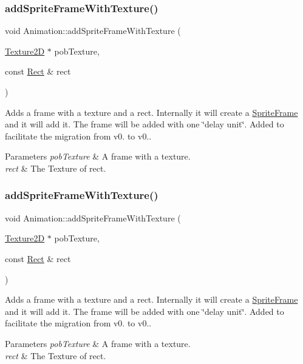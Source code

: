 \subsubsection{\texorpdfstring{add\+Sprite\+Frame\+With\+Texture()}{addSpriteFrameWithTexture()}\hspace{0.1cm}{\footnotesize\ttfamily [1/2]}}
{\footnotesize\ttfamily void Animation\+::add\+Sprite\+Frame\+With\+Texture (\begin{DoxyParamCaption}\item[{\hyperlink{classTexture2D}{Texture2D} $\ast$}]{pob\+Texture,  }\item[{const \hyperlink{classRect}{Rect} \&}]{rect }\end{DoxyParamCaption})}

Adds a frame with a texture and a rect. Internally it will create a \hyperlink{classSpriteFrame}{Sprite\+Frame} and it will add it. The frame will be added with one \char`\"{}delay unit\char`\"{}. Added to facilitate the migration from v0. to v0.. 
\begin{DoxyParams}{Parameters}
{\em pob\+Texture} & A frame with a texture. \\
\hline
{\em rect} & The Texture of rect. \\
\hline
\end{DoxyParams}
\mbox{\label{classAnimation_aae5886a21a9c86e88269e35aa58a7ab1}} 
\subsubsection{\texorpdfstring{add\+Sprite\+Frame\+With\+Texture()}{addSpriteFrameWithTexture()}\hspace{0.1cm}{\footnotesize\ttfamily [2/2]}}
{\footnotesize\ttfamily void Animation\+::add\+Sprite\+Frame\+With\+Texture (\begin{DoxyParamCaption}\item[{\hyperlink{classTexture2D}{Texture2D} $\ast$}]{pob\+Texture,  }\item[{const \hyperlink{classRect}{Rect} \&}]{rect }\end{DoxyParamCaption})}

Adds a frame with a texture and a rect. Internally it will create a \hyperlink{classSpriteFrame}{Sprite\+Frame} and it will add it. The frame will be added with one \char`\"{}delay unit\char`\"{}. Added to facilitate the migration from v0. to v0.. 
\begin{DoxyParams}{Parameters}
{\em pob\+Texture} & A frame with a texture. \\
\hline
{\em rect} & The Texture of rect. \\
\hline
\end{DoxyParams}
\mbox{\label{classAnimation_a2c505ed267d42bbddca6674e46a6fb57}} 
